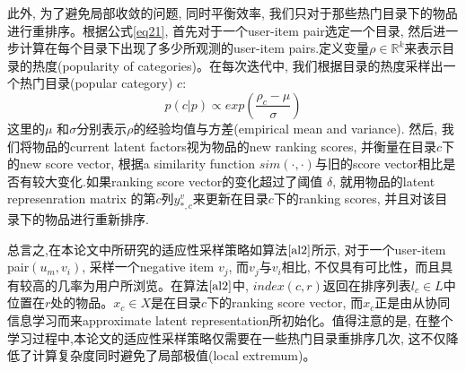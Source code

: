 此外, 为了避免局部收敛的问题, 同时平衡效率, 我们只对于那些热门目录下的物品进行重排序。根据公式\eqref{eq21}, 首先对于一个user-item pair选定一个目录, 然后进一步计算在每个目录下出现了多少所观测的user-item pairs.定义变量$\rho \in \mathbb{R}^k$来表示目录的热度(popularity of categories)。在每次迭代中, 我们根据目录的热度采样出一个热门目录(popular category) $c$:
\begin{equation}
p\left(c|p\right) \propto exp\left(\frac{\rho_c - \mu }{\sigma}\right)
\end{equation}
这里的$\mu$ 和$\sigma$分别表示$\rho$的经验均值与方差(empirical mean and variance). 然后, 我们将物品的current latent factors视为物品的new ranking scores, 并衡量在目录$c$下的new score vector, 根据a similarity function $sim\left(\cdot,\cdot\right)$与旧的score vector相比是否有较大变化.如果ranking score vector的变化超过了阈值 $\delta$, 就用物品的latent represenration matrix 的第$c$列$y_{*,c}^v$来更新在目录$c$下的ranking scores, 并且对该目录下的物品进行重新排序.

总言之,在本论文中所研究的适应性采样策略如算法$\ref{al2}$所示, 对于一个user-item pair$\left(u_m,v_i\right)$, 采样一个negative item $v_j$, 而$v_j$与$v_i$相比, 不仅具有可比性，而且具有较高的几率为用户所浏览。在算法$\ref{al2}$中, $index\left(c,r\right)$返回在排序列表$l_c \in L$中位置在$r$处的物品。$x_c \in X$是在目录$c$下的ranking score vector, 而$x_c$正是由从协同信息学习而来approximate latent representation所初始化。值得注意的是, 在整个学习过程中,本论文的适应性采样策略仅需要在一些热门目录重排序几次, 这不仅降低了计算复杂度同时避免了局部极值(local extremum)。

